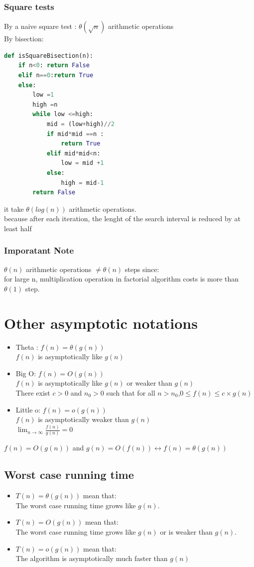 \documentclass[12pt,oneside]{book}
\begin{document}
\subsubsection{Square tests}
By a naive square test : $\theta(\sqrt{n})$ arithmetic operations\\
By bisection:
{\small\begin{lstlisting}[language=python]
def isSquareBisection(n):
	if n<0: return False 
	elif n==0:return True  
	else: 
		low =1 
		high =n 
		while low <=high: 
			mid = (low+high)//2 
			if mid*mid ==n :
				return True 
			elif mid*mid<n:
				low = mid +1 
			else: 
				high = mid-1 
		return False
\end{lstlisting}}
it take $\theta(log(n))$ arithmetic operations.\\
because after each iteration, the lenght of the search interval is reduced by at least half
\subsubsection{Imporatant Note}
$\theta(n)$ arithmetic operations $\not = \theta(n)$ steps since:\\
for large n, multiplication operation in factorial algorithm costs is more than $\theta(1)$ step.
\section{Other asymptotic notations}
\begin{itemize}
	\item Theta : $ f(n) = \theta(g(n))$ \\
	      $f(n)$ is asymptotically like $g(n)$
	\item Big O: $f(n) = O(g(n))$\\
	      $f(n)$ is asymptotically like $g(n)$ or weaker than $g(n)$\\
	      There exist $c>0$ and $n_0 >0$ such that for all $n>n_0$,$0\leq f(n) \leq c\times g(n)$
	\item Little o: $f(n) = o(g(n))$\\
	      $f(n)$ is asymptotically weaker than $g(n)$\\
	      $\lim_{n\to \infty} \frac{f(n)}{g(n)} =0$
\end{itemize}
$f(n) = O(g(n))$ and $g(n) = O(f(n)) \longleftrightarrow f(n) = \theta(g(n))$
\subsection{Worst case running time}
\begin{itemize}
	\item $T(n) = \theta(g(n))$ mean that:\\
	      The worst case running time grows like $g(n)$.
	\item $T(n) = O(g(n))$ mean that:\\
	      The worst case running time grows like $g(n)$ or is weaker than $g(n)$.
	\item $T(n) = o(g(n))$ mean that:\\
	      The algorithm is asymptotically much faster than $g(n)$
\end{itemize}
\end{document}
